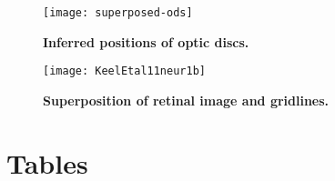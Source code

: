 \documentclass[10pt]{article}
\begin{document}
\begin{figure}[!ht]
  \centering
  \texttt{[image: superposed-ods]}
  \caption{\textbf{Inferred positions of optic discs.}}
  \label{retistruct_plos:fig:ods}
\end{figure}

\begin{figure}[!ht]
  \centering
  \texttt{[image: KeelEtal11neur1b]}
  \caption{\textbf{Superposition of retinal image and gridlines.}}
  \label{retistruct_plos:fig:superpose}
\end{figure}

\section*{Tables}
\end{document}
